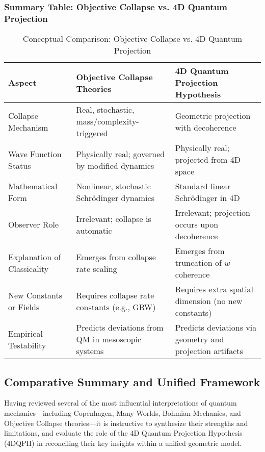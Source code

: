\documentclass[12pt]{article}
\begin{document}
\subsubsection*{Summary Table: Objective Collapse vs. 4D Quantum Projection}

\begin{table}[H]
\centering
\renewcommand{\arraystretch}{1.3}
\begin{tabular}{|p{4cm}|p{5cm}|p{5cm}|}
\hline
\textbf{Aspect} & \textbf{Objective Collapse Theories} & \textbf{4D Quantum Projection Hypothesis} \\
\hline
Collapse Mechanism & Real, stochastic, mass/complexity-triggered & Geometric projection with decoherence \\
\hline
Wave Function Status & Physically real; governed by modified dynamics & Physically real; projected from 4D space \\
\hline
Mathematical Form & Nonlinear, stochastic Schrödinger dynamics & Standard linear Schrödinger in 4D \\
\hline
Observer Role & Irrelevant; collapse is automatic & Irrelevant; projection occurs upon decoherence \\
\hline
Explanation of Classicality & Emerges from collapse rate scaling & Emerges from truncation of \( w \)-coherence \\
\hline
New Constants or Fields & Requires collapse rate constants (e.g., GRW) & Requires extra spatial dimension (no new constants) \\
\hline
Empirical Testability & Predicts deviations from QM in mesoscopic systems & Predicts deviations via geometry and projection artifacts \\
\hline
\end{tabular}
\caption{Conceptual Comparison: Objective Collapse vs. 4D Quantum Projection}
\end{table}


\subsection{Comparative Summary and Unified Framework}

Having reviewed several of the most influential interpretations of quantum mechanics—including Copenhagen, Many-Worlds, Bohmian Mechanics, and Objective Collapse theories—it is instructive to synthesize their strengths and limitations, and evaluate the role of the 4D Quantum Projection Hypothesis (4DQPH) in reconciling their key insights within a unified geometric model.
\end{document}
